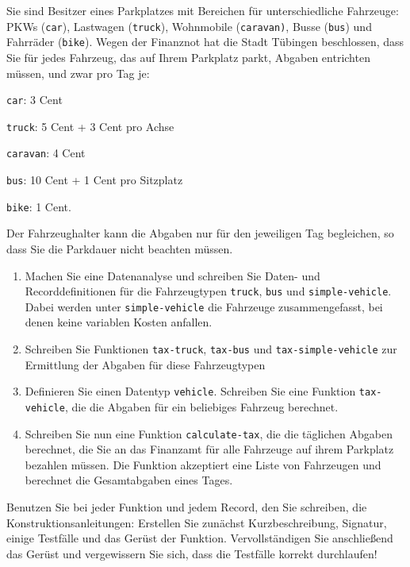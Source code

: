 \begin{aufgabe}
   Sie sind Besitzer eines Parkplatzes mit
  Bereichen für unterschiedliche Fahrzeuge:  PKWs (\texttt{car}), Lastwagen
  (\texttt{truck}), Wohnmobile (\texttt{caravan)}, Busse (\texttt{bus})
  und Fahrräder (\texttt{bike}). 
  Wegen der Finanznot hat die Stadt Tübingen beschlossen, dass 
  Sie für jedes Fahrzeug, das auf Ihrem Parkplatz
  parkt, Abgaben entrichten müssen, und zwar pro Tag je:
  \begin{list}{-}{}
  \item \texttt{car}: 3 Cent
  \item \texttt{truck}: 5 Cent + 3 Cent pro Achse
  \item \texttt{caravan}: 4 Cent
  \item \texttt{bus}: 10 Cent + 1 Cent pro Sitzplatz
  \item \texttt{bike}: 1 Cent.
  \end{list} 
  Der Fahrzeughalter kann die Abgaben nur für den jeweiligen Tag begleichen, 
  so dass Sie die Parkdauer nicht beachten müssen.

  \begin{enumerate}
  \item Machen Sie eine Datenanalyse und schreiben Sie Daten- und 
    Recorddefinitionen für die Fahrzeugtypen \texttt{truck}, \texttt{bus} und
    \texttt{simple-vehicle}. Dabei werden unter \texttt{simple-vehicle} die
    Fahrzeuge zusammengefasst, bei denen keine variablen Kosten anfallen.
  \item Schreiben Sie  Funktionen
    \texttt{tax-truck}, \texttt{tax-bus} und \texttt{tax-simple-vehicle}
    zur Ermittlung der Abgaben für diese Fahrzeugtypen
  \item Definieren Sie einen Datentyp \texttt{vehicle}. Schreiben Sie eine
    Funktion \texttt{tax-vehicle}, die die Abgaben für ein beliebiges Fahrzeug 
    berechnet.    
  \item Schreiben Sie nun eine Funktion \texttt{calculate-tax}, die die täglichen 
    Abgaben berechnet, die Sie an das Finanzamt für alle Fahrzeuge auf ihrem Parkplatz
    bezahlen müssen. Die Funktion akzeptiert eine Liste von Fahrzeugen und
    berechnet die Gesamtabgaben eines Tages.
  \end{enumerate}
  Benutzen Sie bei jeder Funktion und jedem Record, den Sie schreiben,
  die Konstruktionsanleitungen: Erstellen Sie zunächst
  Kurzbeschreibung, Signatur, einige Testfälle und das Gerüst der Funktion.
  Vervollständigen Sie anschließend das Gerüst und vergewissern Sie sich,
  dass die Testfälle korrekt durchlaufen!
\end{aufgabe}

